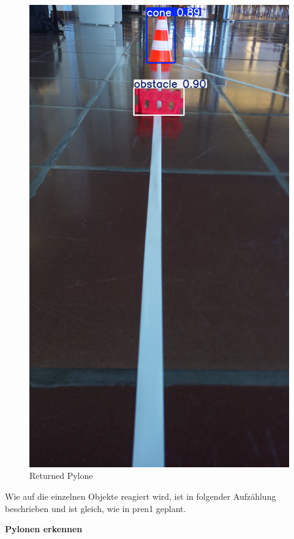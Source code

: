 \begin{figure}[H]
\begin{minipage}[b]{0.23\textwidth}
    \includegraphics[width=\textwidth]{assets/IT/testing/yolo/pylon_behind_obst_annot.png}
    \caption{Returned Pylone}
    \label{fig:expl-algo-4}
  \end{minipage}
\end{figure}

Wie auf die einzelnen Objekte reagiert wird, ist in folgender Aufzählung beschrieben und ist gleich, wie in \acrshort{pren1} geplant.

\textbf{Pylonen erkennen}


